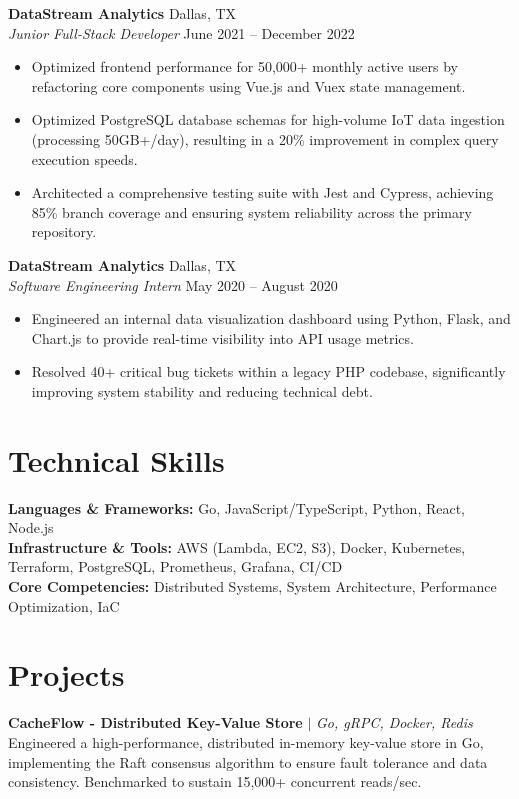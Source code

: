 \documentclass[10pt,a4paper]{article}
\begin{document}
\textbf{DataStream Analytics} \hfill Dallas, TX \\
\textit{Junior Full-Stack Developer} \hfill June 2021 -- December 2022
\begin{itemize}
    \item Optimized frontend performance for 50,000+ monthly active users by refactoring core components using Vue.js and Vuex state management.
    \item Optimized PostgreSQL database schemas for high-volume IoT data ingestion (processing 50GB+/day), resulting in a 20\% improvement in complex query execution speeds.
    \item Architected a comprehensive testing suite with Jest and Cypress, achieving 85\% branch coverage and ensuring system reliability across the primary repository.
\end{itemize}

\textbf{DataStream Analytics} \hfill Dallas, TX \\
\textit{Software Engineering Intern} \hfill May 2020 -- August 2020
\begin{itemize}
    \item Engineered an internal data visualization dashboard using Python, Flask, and Chart.js to provide real-time visibility into API usage metrics.
    \item Resolved 40+ critical bug tickets within a legacy PHP codebase, significantly improving system stability and reducing technical debt.
\end{itemize}

\section{Technical Skills}
\textbf{Languages \& Frameworks:} Go, JavaScript/TypeScript, Python, React, Node.js \\
\textbf{Infrastructure \& Tools:} AWS (Lambda, EC2, S3), Docker, Kubernetes, Terraform, PostgreSQL, Prometheus, Grafana, CI/CD \\
\textbf{Core Competencies:} Distributed Systems, System Architecture, Performance Optimization, IaC

\section{Projects}
\textbf{CacheFlow - Distributed Key-Value Store} $|$ \textit{Go, gRPC, Docker, Redis} \\
Engineered a high-performance, distributed in-memory key-value store in Go, implementing the Raft consensus algorithm to ensure fault tolerance and data consistency. Benchmarked to sustain 15,000+ concurrent reads/sec.
\end{document}
